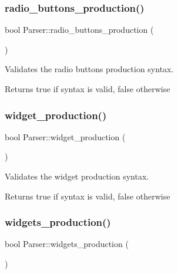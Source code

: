 \subsubsection{\texorpdfstring{radio\+\_\+buttons\+\_\+production()}{radio\_buttons\_production()}}
{\footnotesize\ttfamily bool Parser\+::radio\+\_\+buttons\+\_\+production (\begin{DoxyParamCaption}{ }\end{DoxyParamCaption})\hspace{0.3cm}{\ttfamily [private]}}

Validates the radio buttons production syntax. \begin{DoxyReturn}{Returns}
true if syntax is valid, false otherwise 
\end{DoxyReturn}
\hypertarget{class_parser_ac5fd99f9c1c8e4c72c04c0a4c58a5caf}{}\label{class_parser_ac5fd99f9c1c8e4c72c04c0a4c58a5caf} 
\subsubsection{\texorpdfstring{widget\+\_\+production()}{widget\_production()}}
{\footnotesize\ttfamily bool Parser\+::widget\+\_\+production (\begin{DoxyParamCaption}{ }\end{DoxyParamCaption})\hspace{0.3cm}{\ttfamily [private]}}

Validates the widget production syntax. \begin{DoxyReturn}{Returns}
true if syntax is valid, false otherwise 
\end{DoxyReturn}
\hypertarget{class_parser_a9d1dce16ca4c75ff9a3208cc8200dd23}{}\label{class_parser_a9d1dce16ca4c75ff9a3208cc8200dd23} 
\subsubsection{\texorpdfstring{widgets\+\_\+production()}{widgets\_production()}}
{\footnotesize\ttfamily bool Parser\+::widgets\+\_\+production (\begin{DoxyParamCaption}{ }\end{DoxyParamCaption})\hspace{0.3cm}{\ttfamily [private]}}

